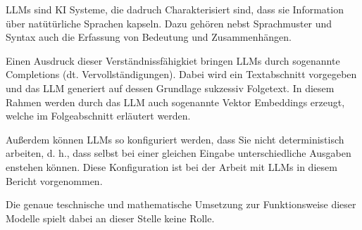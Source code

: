 \documentclass[../main.tex]{subfiles}
\begin{document}
\glspl{LLM} sind KI Systeme, die dadruch Charakterisiert sind, dass sie Information über natütürliche Sprachen kapseln.
Dazu gehören nebst Sprachmuster und Syntax auch die Erfassung von Bedeutung und Zusammenhängen.
\cite{zheng2023large}

Einen Ausdruck dieser Verständnissfähigkiet bringen \glspl{LLM} durch sogenannte Completions (dt. Vervollständigungen).
Dabei wird ein Textabschnitt vorgegeben und das \gls{LLM} generiert auf dessen Grundlage sukzessiv Folgetext.
In diesem Rahmen werden durch das \gls{LLM} auch sogenannte Vektor Embeddings erzeugt, welche im Folgeabschnitt erläutert werden.
\cite{naveed2023comprehensive}

Außerdem können \glspl{LLM} so konfiguriert werden, dass Sie nicht deterministisch arbeiten, d. h., dass selbst bei einer gleichen Eingabe unterschiedliche Ausgaben enstehen können.
Diese Konfiguration ist bei der Arbeit mit \glspl{LLM} in diesem Bericht vorgenommen.

Die genaue teschnische und mathematische Umsetzung zur Funktionsweise dieser Modelle spielt dabei an dieser Stelle keine Rolle.
\end{document}
